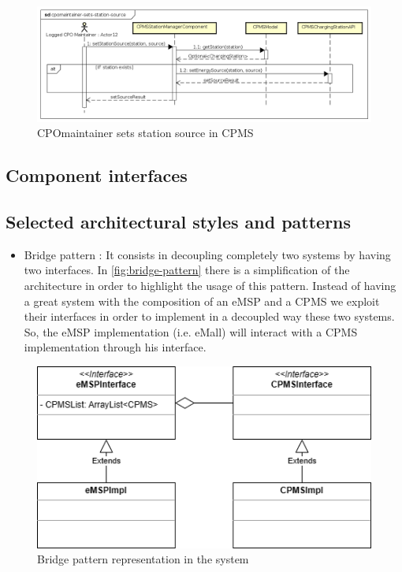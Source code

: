 \begin{figure}[!h]
    \begin{center}
        \includegraphics[keepaspectratio, width=16cm]{Sequence/cpomaintainer-sets-station-source.png}
        \caption{\ac{CPO}maintainer sets station source in \ac{CPMS}}
        \label{fig:cpomaintainer-sets-station-source}
    \end{center}
\end{figure}
\clearpage
\subsection{Component interfaces}


\subsection{Selected architectural styles and patterns}
\begin{itemize}
    \item Bridge pattern \cite{ref:bridge-pattern}: It consists in decoupling completely two systems by having two interfaces. In \autoref{fig:bridge-pattern} there is a simplification of the architecture in order to highlight the usage of this pattern.
          Instead of having a great system with the composition of an \ac{eMSP} and a \ac{CPMS} we exploit their interfaces in order to implement in a decoupled way these two systems. So, the \ac{eMSP} implementation (i.e. \ac{eMall}) will interact with a \ac{CPMS} implementation through his interface.
\end{itemize}
\begin{figure}[!h]
    \begin{center}
        \includegraphics[keepaspectratio, width=16cm]{Graphics/DD-bridge-pattern.drawio.png}
        \caption{Bridge pattern representation in the system}
        \label{fig:bridge-pattern}
    \end{center}
\end{figure}

